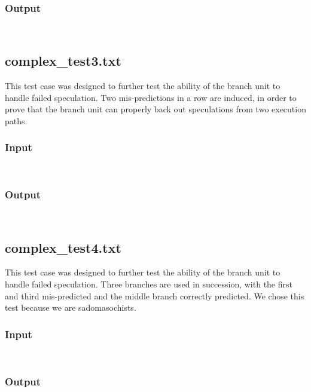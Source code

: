\documentclass[12pt]{article}
\begin{document}
\subsubsection*{Output}
\begin{verbatim}
    
\end{verbatim}

\subsection{complex\_test3.txt}
This test case was designed to further test the ability of the branch unit to handle failed speculation.  Two mis-predictions in a row are induced, in order to prove that the branch unit can properly back out speculations from two execution paths.

\subsubsection*{Input}
\begin{verbatim}
    
\end{verbatim}

\subsubsection*{Output}
\begin{verbatim}
    
\end{verbatim}

\subsection{complex\_test4.txt}
This test case was designed to further test the ability of the branch unit to handle failed speculation.  Three branches are used in succession, with the first and third mis-predicted and the middle branch correctly predicted.  We chose this test because we are sadomasochists.

\subsubsection*{Input}
\begin{verbatim}
    
\end{verbatim}

\subsubsection*{Output}
\begin{verbatim}
    
\end{verbatim}
\end{document}
